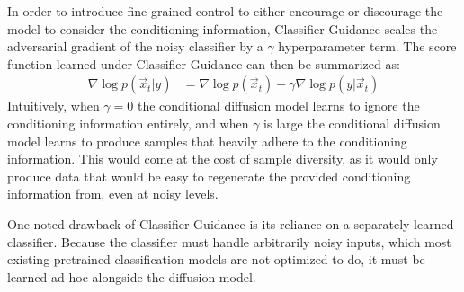 In order to introduce fine-grained control to either encourage or discourage the model to consider the conditioning information, Classifier Guidance scales the adversarial gradient of the noisy classifier by a $\gamma$ hyperparameter term.  The score function learned under Classifier Guidance can then be summarized as:
\begin{align}
    \nabla\log p(\vec{x}_t|y) &= \nabla\log p(\vec{x}_t) + \gamma\nabla\log p(y|\vec{x}_t) \label{eq:150}
\end{align}
Intuitively, when $\gamma=0$ the conditional diffusion model learns to ignore the conditioning information entirely, and when $\gamma$ is large the conditional diffusion model learns to produce samples that heavily adhere to the conditioning information.  This would come at the cost of sample diversity, as it would only produce data that would be easy to regenerate the provided conditioning information from, even at noisy levels.

One noted drawback of Classifier Guidance is its reliance on a separately learned classifier.  Because the classifier must handle arbitrarily noisy inputs, which most existing pretrained classification models are not optimized to do, it must be learned ad hoc alongside the diffusion model.

